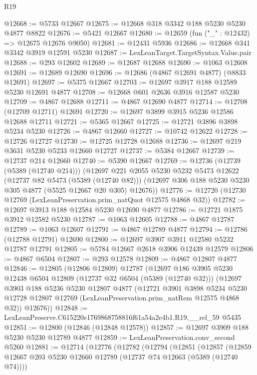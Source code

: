 \begin{lexlean}{R19}
\begin{coremodule}
@12668 := @5733 @12667
@12675 := @12668 @318 @3342 @188 @5230 @5230 @4877 @8822
@12676 := @5421 @12667
@12680 := @12659 (fun ("_" : @12432) => @12675 @12676 @9050)
@12681 := @12431 @5936
@12686 := @12668 @341 @3342 @3919 @12591 @5230
@12687 := LexLeanTarget.TargetSyntax.Value.pair
@12688 := @293 @12602
@12689 := @12687 @12688
@12690 := @1063 @12608
@12691 := @12689 @12690
@12696 := @12686 (@4867 @12691 @4877) (@8833 @12691)
@12697 := @5375 @12667
@12703 := @12697 @3917 @188 @12589 @5230 @12691 @4877
@12708 := @12668 @601 @2636 @3916 @12587 @5230
@12709 := @4867 @12688
@12711 := @4867 @12690 @4877
@12714 := @12708 (@12709 @12711) @12691
@12720 := @12697 @3899 @3915 @5236 @12586 @12688 @12711
@12721 := @5365 @12667
@12725 := @12721 @3896 @3898 @5234 @5230
@12726 := @4867 @12660
@12727 := @10742 @12622
@12728 := @12726 @12727
@12730 := @12725 @12728 @12688
@12736 := @12697 @219 @3631 @5230 @5233 @12660 @12727
@12737 := @5384 @12667
@12739 := @12737 @214 @12660
@12740 := @5390 @12667
@12769 := @12736
    (@12739 (@5389 (@12740 @214)))
    (@12697
      @221
      @2055
      @5230
      @5232
      @5473
      @12622
      (@12737 @82 @5473 (@5389 (@12740 @82)))
      (@12697 @306 @188 @5230 @5230 @305 @4877 (@5525 @12667 @20 @305) @12676))
@12776 := @12720 (@12730 @12769 (LexLeanPreservation.prim_natQuot @12575 @4868 @32))
@12782 := @12697 @3913 @188 @12584 @5230 @12690 @4877
@12786 := @12721 @1875 @3912 @12582 @5230
@12787 := @1063 @12605
@12788 := @4867 @12787
@12789 := @1063 @12607
@12791 := @4867 @12789 @4877
@12794 := @12786 (@12788 @12791) @12690
@12800 := @12697 @3907 @3911 @12580 @5232 @12787 @12791
@12805 := @5784 @12667 @2618 @3906 @12439 @12579
@12806 := @4867 @6504
@12807 := @293 @12578
@12809 := @4867 @12807 @4877
@12846 := @12805
    (@12806 @12809)
    @12787
    (@12697
      @186
      @3905
      @5230
      @12438
      @6504
      @12809
      (@12737 @32 @6504 (@5389 (@12740 @32)))
      (@12697
        @3903
        @188
        @5236
        @5230
        @12807
        @4877
        (@12721
          @3901
          @3898
          @5234
          @5230
          @12728
          @12807
          @12769
          (LexLeanPreservation.prim_natRem @12575 @4868 @32))
        @12676))
@12848 := LexLeanPreserve.C615220e1769868758816f61a54a2e4b1.R19.__rel_59 @5435
@12851 := @12800 (@12846 (@12848 @12578))
@12857 := @12697 @3909 @188 @5230 @5230 @12789 @4877
@12859 := LexLeanPreservation.conv_second @5260
@12881 := @12714
    (@12776
      (@12782
        (@12794
          (@12851
            (@12857
              (@12859 @12667 @203 @5230 @12660 @12789 (@12737 @74 @12663 (@5389 (@12740 @74))))

\end{coremodule}
\end{lexlean}
